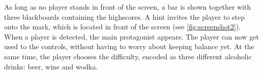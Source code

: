 As long as no player stands in front of the screen, a bar is shown together with three blackboards containing the highscores. A hint invites the player to step onto the mark, which is located in front of the screen (see \autoref{fig:screenshot2}). When a player is detected, the main protagonist \ed appears. The player can now get used to the controls, without having to worry about keeping balance yet. At the same time, the player chooses the difficulty, encoded as three different alcoholic drinks: beer, wine and wodka.

